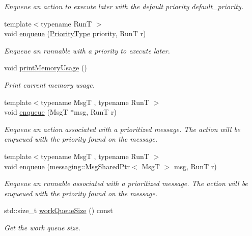 \begin{DoxyCompactItemize}
\begin{DoxyCompactList}\small\item\em Enqueue an action to execute later with the default priority {\ttfamily default\+\_\+priority}. \end{DoxyCompactList}\item 
{\footnotesize template$<$typename RunT $>$ }\\void \hyperlink{structvt_1_1sched_1_1_scheduler_a0bdc94a90457db0a1cf1e64bd463e927}{enqueue} (\hyperlink{namespacevt_a86bff9f556eb761b27fc8600d006ac04}{Priority\+Type} priority, RunT r)
\begin{DoxyCompactList}\small\item\em Enqueue an runnable with a priority to execute later. \end{DoxyCompactList}\item 
void \hyperlink{structvt_1_1sched_1_1_scheduler_a48a6fdb0c7384df09b467c0e68ca8e6f}{print\+Memory\+Usage} ()
\begin{DoxyCompactList}\small\item\em Print current memory usage. \end{DoxyCompactList}\item 
{\footnotesize template$<$typename MsgT , typename RunT $>$ }\\void \hyperlink{structvt_1_1sched_1_1_scheduler_af7c602c560b0a38451e3a020dbc9dd5b}{enqueue} (MsgT $\ast$msg, RunT r)
\begin{DoxyCompactList}\small\item\em Enqueue an action associated with a prioritized message. The action will be enqueued with the priority found on the message. \end{DoxyCompactList}\item 
{\footnotesize template$<$typename MsgT , typename RunT $>$ }\\void \hyperlink{structvt_1_1sched_1_1_scheduler_ad513c8019078c1b87de81af17df5e920}{enqueue} (\hyperlink{structvt_1_1messaging_1_1_msg_shared_ptr}{messaging\+::\+Msg\+Shared\+Ptr}$<$ MsgT $>$ msg, RunT r)
\begin{DoxyCompactList}\small\item\em Enqueue an runnable associated with a prioritized message. The action will be enqueued with the priority found on the message. \end{DoxyCompactList}\item 
std\+::size\+\_\+t \hyperlink{structvt_1_1sched_1_1_scheduler_a6ee315ffd90f37a277bb2b5622af1f4f}{work\+Queue\+Size} () const
\begin{DoxyCompactList}\small\item\em Get the work queue size. \end{DoxyCompactList}\item 

\end{DoxyCompactItemize}
